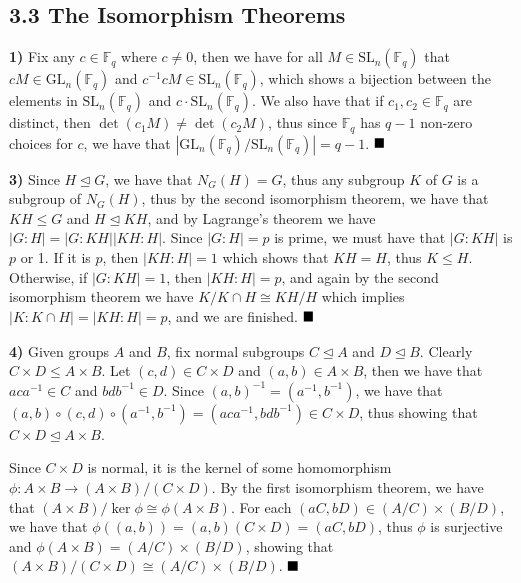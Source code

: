 \documentclass[12pt]{article}
\newcommand{\F}{\mathbb{F}}
\renewcommand{\t}[1]{\text{#1}}
\newcommand{\vertb}[1]{\left\vert#1\right\vert}
\newcommand{\normsub}{\trianglelefteq}
\newcommand{\done}{\ensuremath{\strut\hfill\blacksquare}}
\begin{document}
\pagestyle{fancy}

\setlength{\parindent}{0in}
\setlength{\parskip}{0.09in}

\subsection*{3.3 The Isomorphism Theorems}

\textbf{1)}
Fix any \( c \in \F_q \) where \( c \ne 0 \), then we have for all
\( M \in \t{SL}_n(\F_q) \) that \( cM \in \t{GL}_n(\F_q) \) and
\( c^{-1}cM \in \t{SL}_n(\F_q) \), which shows a bijection between the elements
in \( \t{SL}_n(\F_q) \) and \( c\cdot\t{SL}_n(\F_q) \).
We also have that if \( c_1,c_2 \in \F_q \) are distinct, then
\( \det(c_1M) \ne \det(c_2M) \), thus since \( \F_q \) has \( q - 1 \) non-zero
choices for \( c \), we have that
\( \vertb{\t{GL}_n(\F_q) / \t{SL}_n(\F_q)} = q - 1 \).
\done

\textbf{3)}
Since \( H \normsub G \), we have that \( N_G(H) = G \), thus any subgroup
\( K \) of \( G \) is a subgroup of \( N_G(H) \), thus by the second
isomorphism theorem, we have that \( KH \leq G \) and \( H \normsub KH \), and
by Lagrange's theorem we have
\( \vertb{G : H} = \vertb{G : KH}\vertb{KH : H} \).
Since \( \vertb{G : H} = p \) is prime, we must have that \( \vertb{G : KH} \)
is \( p \) or 1.
If it is \( p \), then \( \vertb{KH : H} = 1 \) which shows that \( KH = H \),
thus \( K \leq H \).
Otherwise, if \( \vertb{G : KH} = 1 \), then \( \vertb{KH : H} = p \), and
again by the second isomorphism theorem we have \( K/K \cap H \cong KH/H \)
which implies \( \vertb{K : K \cap H} = \vertb{KH : H} = p \), and we are
finished.
\done

\textbf{4)}
Given groups \( A \) and \( B \), fix normal subgroups
\( C \normsub A \) and \( D \normsub B \).
Clearly \( C \times D \leq A \times B \).
Let \( (c,d) \in C \times D \) and \( (a,b) \in A \times B \), then we have
that \( aca^{-1} \in C \) and \( bdb^{-1} \in D \).
Since \( (a,b)^{-1} = (a^{-1},b^{-1}) \), we have that
\(
	(a,b) \circ (c,d) \circ (a^{-1},b^{-1})
	= (aca^{-1},bdb^{-1}) \in C \times D
\),
thus showing that \( C \times D \normsub A \times B \).

Since \( C \times D \) is normal, it is the kernel of some homomorphism
\( \phi : A \times B \to (A \times B)/(C \times D) \).
By the first isomorphism theorem, we have that
\( (A \times B)/\ker\phi \cong \phi(A \times B) \).
For each \( (aC,bD) \in (A/C) \times (B/D) \), we have that
\( \phi((a,b)) = (a,b)(C \times D) = (aC,bD) \), thus \( \phi \) is surjective
and \( \phi(A \times B) = (A/C) \times (B/D) \), showing that
\( (A \times B)/(C \times D) \cong (A/C) \times (B/D) \).
\done
\end{document}
